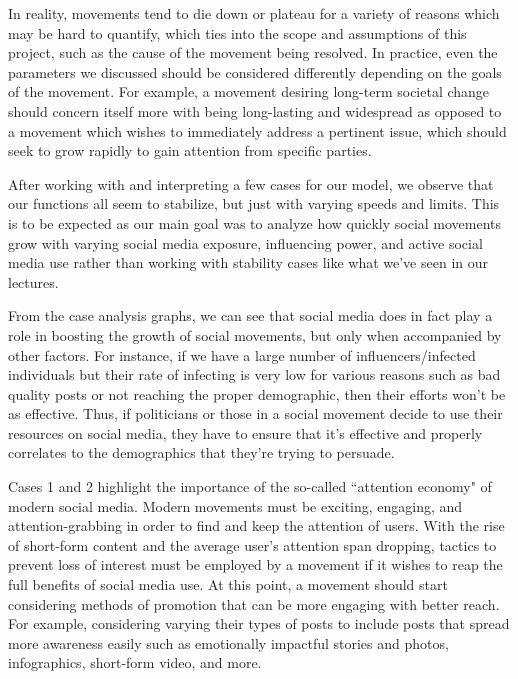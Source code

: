 \documentclass{article}
\begin{document}
    In reality, movements tend to die down or plateau for a variety of reasons which may be hard to quantify, which ties into the scope and assumptions of this project, such as the cause of the movement being resolved. In practice, even the parameters we discussed should be considered differently depending on the goals of the movement. For example, a movement desiring long-term societal change should concern itself more with being long-lasting and widespread as opposed to a movement which wishes to immediately address a pertinent issue, which should seek to grow rapidly to gain attention from specific parties.
    
    After working with and interpreting a few cases for our model, we observe that our functions all seem to stabilize, but just with varying speeds and limits. This is to be expected as our main goal was to analyze how quickly social movements grow with varying social media exposure, influencing power, and active social media use rather than working with stability cases like what we've seen in our lectures. 
    
    From the case analysis graphs, we can see that social media does in fact play a role in boosting the growth of social movements, but only when accompanied by other factors. For instance, if we have a large number of influencers/infected individuals but their rate of infecting is very low for various reasons such as bad quality posts or not reaching the proper demographic, then their efforts won't be as effective. Thus, if politicians or those in a social movement decide to use their resources on social media, they have to ensure that it's effective and properly correlates to the demographics that they're trying to persuade. 

    Cases 1 and 2 highlight the importance of the so-called ``attention economy" of modern social media. Modern movements must be exciting, engaging, and attention-grabbing in order to find and keep the attention of users. With the rise of short-form content and the average user's attention span dropping\cite{lorenz-spreen_accelerating_2019}, tactics to prevent loss of interest must be employed by a movement if it wishes to reap the full benefits of social media use. At this point, a movement should start considering methods of promotion that can be more engaging with better reach. For example, considering varying their types of posts to include posts that spread more awareness easily such as emotionally impactful stories and photos, infographics, short-form video, and more.
\end{document}
